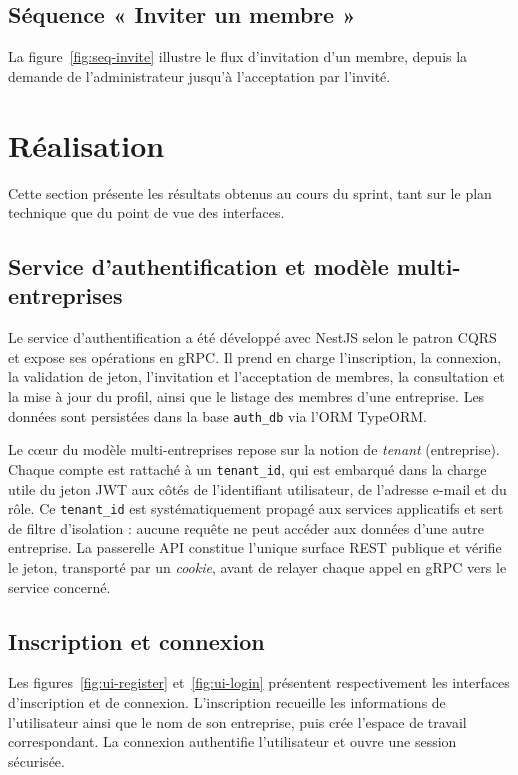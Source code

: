 
\subsection{Séquence « Inviter un membre »}
La figure~\ref{fig:seq-invite} illustre le flux d'invitation d'un membre,
depuis la demande de l'administrateur jusqu'à l'acceptation par l'invité.


\section{Réalisation}
Cette section présente les résultats obtenus au cours du sprint, tant sur le
plan technique que du point de vue des interfaces.

\subsection{Service d'authentification et modèle multi-entreprises}
Le service d'authentification a été développé avec NestJS selon le patron
CQRS et expose ses opérations en gRPC. Il prend en charge l'inscription, la
connexion, la validation de jeton, l'invitation et l'acceptation de membres,
la consultation et la mise à jour du profil, ainsi que le listage des
membres d'une entreprise. Les données sont persistées dans la base
\texttt{auth\_db} via l'ORM TypeORM.

Le c\oe{}ur du modèle multi-entreprises repose sur la notion de
\emph{tenant} (entreprise). Chaque compte est rattaché à un
\texttt{tenant\_id}, qui est embarqué dans la charge utile du jeton JWT aux
côtés de l'identifiant utilisateur, de l'adresse e-mail et du rôle. Ce
\texttt{tenant\_id} est systématiquement propagé aux services applicatifs
et sert de filtre d'isolation : aucune requête ne peut accéder aux données
d'une autre entreprise. La passerelle API constitue l'unique surface REST
publique et vérifie le jeton, transporté par un \emph{cookie}, avant de
relayer chaque appel en gRPC vers le service concerné.

\subsection{Inscription et connexion}
Les figures~\ref{fig:ui-register} et~\ref{fig:ui-login} présentent
respectivement les interfaces d'inscription et de connexion. L'inscription
recueille les informations de l'utilisateur ainsi que le nom de son
entreprise, puis crée l'espace de travail correspondant. La connexion
authentifie l'utilisateur et ouvre une session sécurisée.

